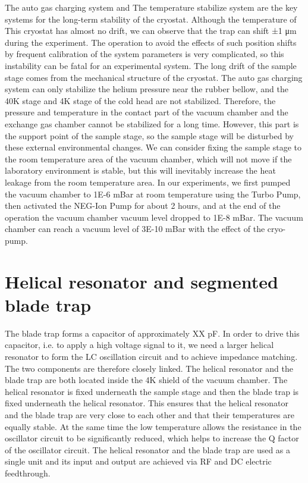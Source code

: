 The auto gas charging system and The temperature stabilize system are the key systems for the long-term stability of the cryostat. Although the temperature of This cryostat has almost no drift, we can observe that the trap can shift ±1 μm during the experiment. The operation to avoid the effects of such position shifts by frequent calibration of the system parameters is very complicated, so this instability can be fatal for an experimental system. The long drift of the sample stage comes from the mechanical structure of the cryostat. The auto gas charging system can only stabilize the helium pressure near the rubber bellow, and the 40K stage and 4K stage of the cold head are not stabilized. Therefore, the pressure and temperature in the contact part of the vacuum chamber and the exchange gas chamber cannot be stabilized for a long time. However, this part is the support point of the sample stage, so the sample stage will be disturbed by these external environmental changes. We can consider fixing the sample stage to the room temperature area of the vacuum chamber, which will not move if the laboratory environment is stable, but this will inevitably increase the heat leakage from the room temperature area. In our experiments, we first pumped the vacuum chamber to 1E-6 mBar at room temperature using the Turbo Pump, then activated the NEG-Ion Pump for about 2 hours, and at the end of the operation the vacuum chamber vacuum level dropped to 1E-8 mBar. The vacuum chamber can reach a vacuum level of 3E-10 mBar with the effect of the cryo-pump.



\section{Helical resonator and segmented blade trap}

The blade trap forms a capacitor of approximately XX pF. In order to drive this capacitor, i.e. to apply a high voltage signal to it, we need a larger helical resonator to form the LC oscillation circuit and to achieve impedance matching. The two components are therefore closely linked. The helical resonator and the blade trap are both located inside the 4K shield of the vacuum chamber. The helical resonator is fixed underneath the sample stage and then the blade trap is fixed underneath the helical resonator. This ensures that the helical resonator and the blade trap are very close to each other and that their temperatures are equally stable. At the same time the low temperature allows the resistance in the oscillator circuit to be significantly reduced, which helps to increase the Q factor of the oscillator circuit. The helical resonator and the blade trap are used as a single unit and its input and output are achieved via RF and DC electric feedthrough.

